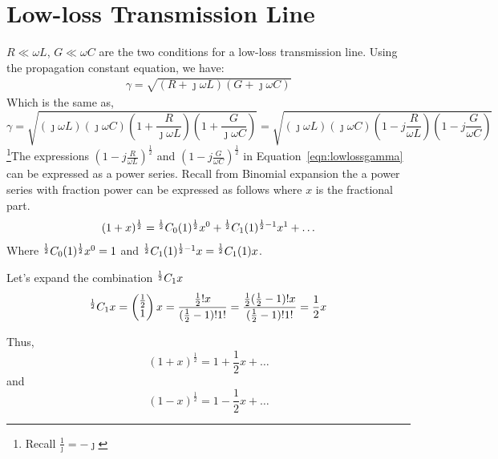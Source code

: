 \section{Low-loss Transmission Line}
$R \ll \omega L$, $G \ll \omega C$ are the two conditions for a low-loss transmission line. Using the propagation constant equation, we have:
\begin{align*}
\gamma = \sqrt{(R + \jmath\omega L)(G + \jmath\omega C)}
\end{align*}
Which is the same as,
\begin{dmath}
\gamma = \sqrt{{(\jmath\omega L)(\jmath\omega C)\left(1 + \frac{R}{\jmath\omega L}\right)\left(1 + \frac{G}{\jmath\omega C}\right)}}
= \sqrt{{(\jmath\omega L)(\jmath\omega C)\left(1 - j\frac{R}{\omega L}\right)\left(1 - j\frac{G}{\omega C}\right)}}
\label{eqn:lowlossgamma}
\end{dmath}
\footnote{Recall $\frac{1}{\jmath} = -\jmath$}The expressions $\left(1 - j\frac{R}{\omega L}\right)^{\frac{1}{2}}$ and $\left(1 - j\frac{G}{\omega C}\right)^{\frac{1}{2}}$ in Equation~\ref{eqn:lowlossgamma} can be expressed as a power series. Recall from Binomial expansion the a power series with fraction power can be expressed as follows where $x$ is the fractional part.
\begin{dmath*}
(1 + x)^{\frac{1}{2}} = \Comb{\frac{1}{2}}{0}(1)^{\frac{1}{2}}x^0 + \Comb{\frac{1}{2}}{1}(1)^{{\frac{1}{2}} - 1}x^1 + \ldots
\end{dmath*}
Where ${}^{\frac{1}{2}}C_{0}(1)^{\frac{1}{2}}x^0 = 1$ and ${}^{\frac{1}{2}}C_{1}(1)^{\frac{1}{2} - 1}x = {}^{\frac{1}{2}}C_{1}(1)x$.

Let's expand the combination ${}^{\frac{1}{2}}C_{1} x$
\begin{dmath*}
\Comb{\frac{1}{2}}{1} x = \begin{pmatrix}\frac{1}{2}\\1 \end{pmatrix}x = \frac{\frac{1}{2}! x}{(\frac{1}{2} - 1)!1!} = \frac{\frac{1}{2}(\frac{1}{2} - 1)! x}{(\frac{1}{2} - 1)!1!} = \frac{1}{2}x
\end{dmath*}

Thus,
\[(1 + x)^{\frac{1}{2}} = 1 + \frac{1}{2}x + \ldots\]
and
\[(1 - x)^{\frac{1}{2}} = 1 - \frac{1}{2}x + \ldots\]

